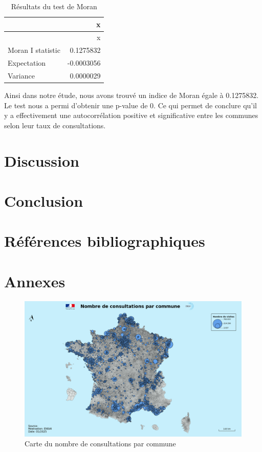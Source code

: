 \documentclass[
]{article}
\begin{document}
\begin{longtable}[]{@{}lr@{}}
\caption{Résultats du test de Moran}\tabularnewline
\toprule\noalign{}
& x \\
\midrule\noalign{}
\endfirsthead
\toprule\noalign{}
& x \\
\midrule\noalign{}
\endhead
\bottomrule\noalign{}
\endlastfoot
Moran I statistic & 0.1275832 \\
Expectation & -0.0003056 \\
Variance & 0.0000029 \\
\end{longtable}

Ainsi dans notre étude, nous avons trouvé un indice de Moran égale à
0.1275832. Le test nous a permi d'obtenir une p-value de 0. Ce qui
permet de conclure qu'il y a effectivement une autocorrélation positive
et significative entre les communes selon leur taux de consultations.

\hypertarget{discussion}{%
\section{Discussion}\label{discussion}}

\hypertarget{conclusion}{%
\section{Conclusion}\label{conclusion}}

\hypertarget{ruxe9fuxe9rences-bibliographiques}{%
\section{Références
bibliographiques}\label{ruxe9fuxe9rences-bibliographiques}}

\hypertarget{annexes}{%
\section{Annexes}\label{annexes}}

\begin{figure}
    \centering
    \includegraphics[width=1\linewidth]{../cartes/nombre_de_consulatations}
    \caption{Carte du nombre de consultations par commune}
    \label{fig:figure}
\end{figure}
\end{document}
